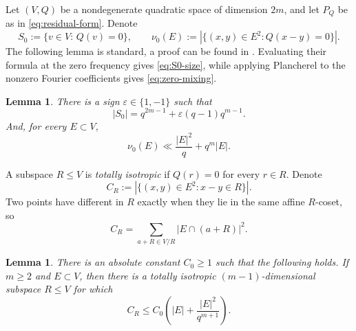 \documentclass[11pt]{article}
\newtheorem{lemma}[theorem]{Lemma}
\newcommand{\F}{\mathbb F}
\begin{document}
Let $(V,Q)$ be a nondegenerate quadratic space of dimension $2m$,
and let $P_Q$ be as in \eqref{eq:residual-form}. %
Denote
\[
S_0:=\{v\in V:\, Q(v)=0\},\qquad  \nu_0(E):=|\{(x,y)\in E^2:Q(x-y)=0\}|.
\]
The following lemma is standard, a proof can be found in \cite[Lemma 4.1]{KohShen13}. Evaluating their formula at the zero frequency gives \eqref{eq:S0-size}, while applying Plancherel to the nonzero Fourier coefficients gives \eqref{eq:zero-mixing}.

\begin{lemma}
\label{lem:zero-spectrum}
There is a sign $\varepsilon\in\{1,-1\}$ such that
\begin{equation} \label{eq:S0-size}
|S_0|=q^{2m-1}+\varepsilon(q-1)q^{m-1}.
\end{equation}
And, for every $E\subset V$, 
\begin{equation}\label{eq:zero-mixing}
\nu_0(E)\ll \frac{|E|^2}{q}+q^m |E|.
\end{equation}
\end{lemma}

A subspace $R\le V$ is \emph{totally isotropic} if $Q(r)=0$ for every $r\in R$. Denote
\[
 C_R:=|\{(x,y)\in E^2:x-y\in R\}|.
\]
Two points have different in $R$ exactly when they lie in the same affine $R$-coset, so 
\[
C_R=\sum_{a+R\in V/R}|E\cap(a+R)|^2.
\]

\begin{lemma}
\label{lem:choose-R}
There is an absolute constant $C_0\ge1$ such that the
following holds. If $m\ge2$ and $E\subset V$, then there is a totally isotropic $(m-1)$-dimensional subspace $R\le V$ for which
\begin{equation} \label{eq:CR-bound}
C_R \le C_0\left(|E|+\frac{|E|^2}{q^{m+1}}\right).
\end{equation}
\end{lemma}
\end{document}
